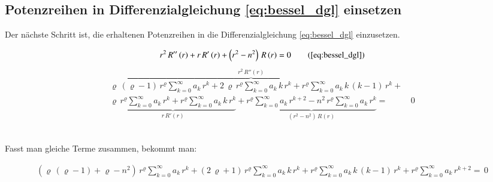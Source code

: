 \subsection*{Potenzreihen in Differenzialgleichung \ref{eq:bessel_dgl} einsetzen}

\begin{normalsize}
	Der n\"achste Schritt ist,
	die erhaltenen Potenzreihen in die Differenzialgleichung \ref{eq:bessel_dgl} einzusetzen.
\end{normalsize}

\begin{align*}
	r^2 \, R'' \left( r \right)
	+
	r \, R' \left( r \right)
	+
	\left( r^2 - n^2 \right) \, R \left( r \right)
	=
	0
	\tag{\ref{eq:bessel_dgl}}
\end{align*}
%
\begin{align*}
	\overbrace{
		\varrho \, \left( \varrho - 1 \right) \, r^{\varrho}
		\sum_{k=0}^{\infty} a_k \, r^k
		+
		2 \, \varrho \, r^{\varrho}
		\sum_{k=0}^{\infty} a_k \, k \, r^k
		+
		r^{\varrho}
		\sum_{k=0}^{\infty} a_k \, k \, \left( k - 1 \right) \, r^k
	}^{r^2 \, R''\left( r \right)}
	+ \\
	\underbrace{
		\varrho \, r^{\varrho}
		\sum_{k=0}^{\infty} a_k \, r^k
		+
		r^{\varrho}
		\sum_{k=0}^{\infty} a_k \, k \, r^k
	}_{r \, R' \left( r \right)}
	+ 
	\underbrace{
		r^{\varrho}
			\sum_{k=0}^{\infty} a_k \, r^{k + 2}
		-
		n^2 \, r^{\varrho}
		\sum_{k=0}^{\infty} a_k \, r^k
	}_{\left( r^2 - n^2 \right) \, R \left( r \right)}
	= & \, 0
\end{align*}
\\
\begin{normalsize}
	Fasst man gleiche Terme zusammen, bekommt man:
\end{normalsize}
\begin{align}
	\left(
	\varrho \, \left( \varrho - 1 \right)
	+ 
	\varrho
	-
	n^2
	\right)
	\, r^{\varrho}
	\sum_{k=0}^{\infty} a_k \, r^k
	+ 
	\left(	
	2 \, \varrho
	+
	1
	\right)
	\, r^{\varrho}
	\sum_{k=0}^{\infty} a_k \, k \, r^k
	+
	r^{\varrho}
	\sum_{k=0}^{\infty} a_k \, k \, \left( k - 1 \right) \, r^k
	+ 
	r^{\varrho}
	\sum_{k=0}^{\infty} a_k \, r^{k + 2}
	= \, 0
	\label{eq:bessel:potenzreihe:dgl:vereinfacht}
\end{align}
%
